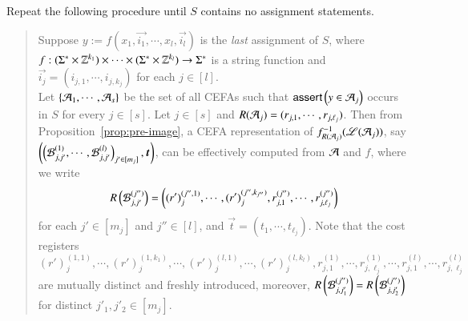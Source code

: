 Repeat the following procedure until $S$ contains no assignment statements.
%
\begin{quote}
Suppose $y := f(x_1, \vec{i_1}, \cdots, x_l, \vec{i_l})$ is the \emph{last} assignment of $S$, where $f: (\Sigma^* \times \mathbb{Z}^{k_1}) \times \cdots \times (\Sigma^* \times \mathbb{Z}^{k_l}) \rightarrow \Sigma^*$ is a string function and $\vec{i_j}= (i_{j,1}, \cdots, i_{j, k_j})$ for each $j \in [l]$.
\\
Let $\{\mathcal{A}_1, \cdots, \mathcal{A}_s\}$ be the set of all CEFAs such that $\textsf{assert}\left(y \in \mathcal{A}_j\right)$ occurs in $S$ for every $j \in [s]$. 
Let $j \in [s]$ and $R(\mathcal{A}_j)=(r_{j,1}, \cdots, r_{j, \ell_j})$. Then from Proposition~\ref{prop:pre-image}, 
a CEFA representation of $f^{-1}_{R(\mathcal{A}_j)}(\mathscr{L}(\mathcal{A}_j))$, say $\left(\left(\cB^{(1)}_{j, j'}, \cdots, \cB^{(l)}_{j, j'}\right)_{j' \in [m_j]}, \vec{t}\right)$, can be effectively computed from $\mathcal{A}$ and $f$, where we write
\[
R\left(\mathcal{B}^{(j'')}_{j, j'}\right)=\left((r')^{(j'',1)}_{j}, \cdots, (r')_{j}^{(j'',k_{j''})}, r^{(j'')}_{j, 1}, \cdots,r^{(j'')}_{j, \ell_j} \right)
\]
for each $j' \in [m_j]$ and $j'' \in [l]$, and $\vec{t}=(t_1,\cdots, t_{\ell_j})$. Note that the cost registers $(r')^{(1,1)}_{j}, \cdots, (r')_{j}^{(1,k_1)}, \cdots, (r')^{(l,1)}_{j}, \cdots, (r')_{j}^{(l,k_l)}, r^{(1)}_{j, 1}, \cdots,r^{(1)}_{j, \ell_j}, \cdots, r^{(l)}_{j, 1}, \cdots,r^{(l)}_{j, \ell_j}$ are mutually distinct and freshly introduced, moreover, $R\left(\mathcal{B}^{(j'')}_{j, j'_1}\right)=R\left(\mathcal{B}^{(j'')}_{j, j'_2}\right)$ for distinct $j'_1,j'_2 \in [m_j]$.
%


\end{quote}
